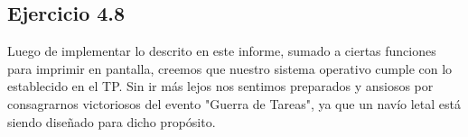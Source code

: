 \bigskip
\bigskip
\bigskip
\bigskip
\bigskip
\subsection{Ejercicio 4.8}
\par{
Luego de implementar lo descrito en este informe, sumado a ciertas funciones para imprimir en pantalla, creemos que nuestro sistema operativo cumple con lo establecido en el TP. Sin ir más lejos nos sentimos preparados y ansiosos por consagrarnos victoriosos del evento "Guerra de Tareas", ya que un navío letal está siendo diseñado para dicho propósito.}